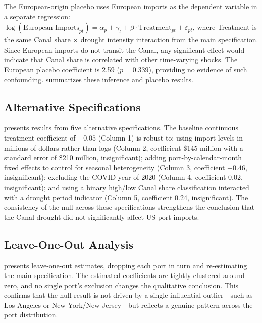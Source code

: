 \documentclass[12pt]{article}
\begin{document}
The European-origin placebo uses European imports as the dependent variable in a separate regression: $\log(\text{European Imports}_{pt}) = \alpha_p + \gamma_t + \beta \cdot \text{Treatment}_{pt} + \varepsilon_{pt}$, where Treatment is the same Canal share $\times$ drought intensity interaction from the main specification. Since European imports do not transit the Canal, any significant effect would indicate that Canal share is correlated with other time-varying shocks. The European placebo coefficient is 2.59 ($p = 0.339$), providing no evidence of such confounding.  summarizes these inference and placebo results.

\subsection{Alternative Specifications}

 presents results from five alternative specifications. The baseline continuous treatment coefficient of $-0.05$ (Column 1) is robust to: using import levels in millions of dollars rather than logs (Column 2, coefficient \$145 million with a standard error of \$210 million, insignificant); adding port-by-calendar-month fixed effects to control for seasonal heterogeneity (Column 3, coefficient $-0.46$, insignificant); excluding the COVID year of 2020 (Column 4, coefficient 0.02, insignificant); and using a binary high/low Canal share classification interacted with a drought period indicator (Column 5, coefficient 0.24, insignificant). The consistency of the null across these specifications strengthens the conclusion that the Canal drought did not significantly affect US port imports.

\subsection{Leave-One-Out Analysis}

 presents leave-one-out estimates, dropping each port in turn and re-estimating the main specification. The estimated coefficients are tightly clustered around zero, and no single port's exclusion changes the qualitative conclusion. This confirms that the null result is not driven by a single influential outlier---such as Los Angeles or New York/New Jersey---but reflects a genuine pattern across the port distribution.


\end{document}
